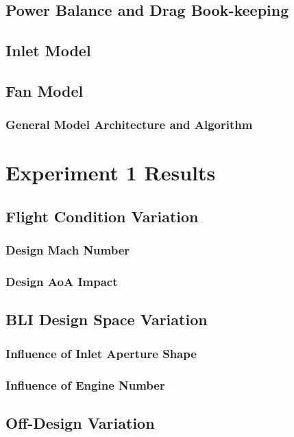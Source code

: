 		\subsection{Power Balance and Drag Book-keeping}
		\subsection{Inlet Model}
		\subsection{Fan Model}
			\subsubsection{General Model Architecture and Algorithm}
			
	\section{Experiment 1 Results}
	
	\subsection{Flight Condition Variation}
	
	\subsubsection{Design Mach Number}
	
	\subsubsection{Design AoA Impact}
	
	\subsection{BLI Design Space Variation}
	
	\subsubsection{Influence of Inlet Aperture Shape}
	
	\subsubsection{Influence of Engine Number}
	
	\subsection{Off-Design Variation}
	
